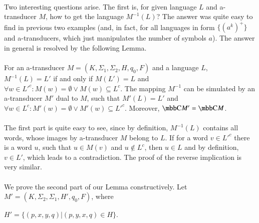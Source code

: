 \paragraph{}
Two interesting questions arise. The first is, for given language $L$ and a-transducer $M$, how to get the language $M^{-1}(L)$? The answer was quite easy to find in previous two examples (and, in fact, for all languages in form $\{ (a^k)^+ \}$ and a-transducers, which just manipulates the number of symbols $a$). The answer in general is resolved by the following Lemma.

\paragraph{}
\clema For an a-transducer $M = (K, \Sigma_1, \Sigma_2, H, q_0, F)$ and a language $L$, $M^{-1}(L) = L'$ if and only if $M(L') = L$ and $\forall w \in L'^c: M(w) = \emptyset \vee M(w) \subseteq L^c$. The mapping $M^{-1}$ can be simulated by an a-transducer $M'$ dual to $M$, such that $M'(L) = L'$ and $\forall w \in L^c: M'(w) = \emptyset \vee M'(w) \subseteq L'^c$. Moreover, $\C{M'} = \C{M}$.

\paragraph{}
\dokaz The first part is quite easy to see, since by definition, $M^{-1}(L)$ contains all words, whose images by a-transducer $M$ belong to $L$. If for a word $v \in L'^c$ there is a word $u$, such that $u \in M(v)$ and $u \notin L^c$, then $u \in L$ and by definition, $v \in L'$, which leads to a contradiction. The proof of the reverse implication is very similar.

\paragraph{}
We prove the second part of our Lemma constructively. Let $M' = (K, \Sigma_2, \Sigma_1, H', q_0, F)$, where\\
\centerline{$H'=\{(p,x,y,q)|(p,y,x,q) \in H\}$.} 

